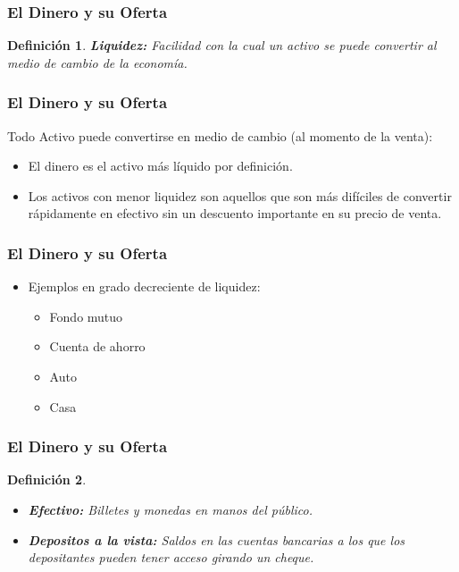 \documentclass[dvipsnames,table,leqno]{beamer}
\newtheorem{mydef}{Definición}
\begin{document}
		\begin{frame}
			\frametitle{El Dinero y su Oferta}
			\begin{mydef}
				\textbf{Liquidez:} Facilidad con la cual un activo se puede convertir al medio de cambio de la economía.
			\end{mydef}
		\end{frame}	

		\begin{frame}
			\frametitle{El Dinero y su Oferta}
			Todo Activo puede convertirse en medio de cambio (al momento de la venta):
			\begin{itemize}
				\item El dinero es el activo más líquido por definición.
				\item Los activos con menor liquidez son aquellos que son más difíciles de convertir rápidamente en efectivo sin un descuento importante en su precio de venta.
			\end{itemize}
		\end{frame}			

		\begin{frame}
			\frametitle{El Dinero y su Oferta}
			\begin{itemize}
				\item Ejemplos en grado decreciente de liquidez:
					\begin{itemize}
						\item Fondo mutuo
						\item Cuenta de ahorro
						\item Auto
						\item Casa
					\end{itemize}
			\end{itemize}
		\end{frame}		

		\begin{frame}
			\frametitle{El Dinero y su Oferta}
			\begin{mydef}
				\begin{itemize}
					\item \textbf{Efectivo:} Billetes y monedas en manos del público.
					\item \textbf{Depositos a la vista:} Saldos en las cuentas bancarias a los que los depositantes pueden tener acceso girando un cheque.
				\end{itemize}
			\end{mydef}
		\end{frame}	
\end{document}
